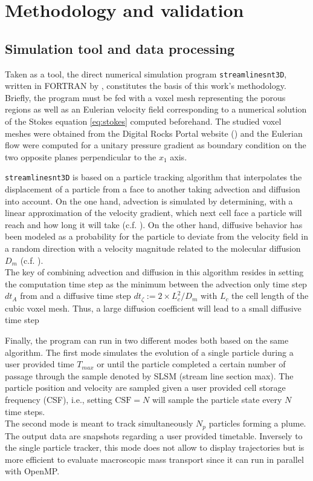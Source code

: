 \chapter{Methodology and validation}
\section{Simulation tool and data processing}
Taken as a tool, the direct numerical simulation program \texttt{streamlinesnt3D}, written in \textsc{FORTRAN} by \citet{Meyer2017}, constitutes the basis of this work's methodology. 
Briefly, the program must be fed with a voxel mesh representing the porous regions as well as an Eulerian velocity field corresponding to a numerical solution of the Stokes equation \eqref{eq:stokes} computed beforehand.
The studied voxel meshes were obtained from the Digital Rocks Portal website (\citet{digitalrocksportal}) and the Eulerian flow were computed for a unitary pressure gradient as boundary condition on the two opposite planes perpendicular to the $x_1$ axis.

\texttt{streamlinesnt3D} is based on a particle tracking algorithm that interpolates the displacement of a particle from a face to another taking advection and diffusion into account.
On the one hand, advection is simulated by determining, with a linear approximation of the velocity gradient, which next cell face a particle will reach and how long it will take (c.f. \cite{Pollock1988}).
On the other hand, diffusive behavior has been modeled as a probability for the particle to deviate from the velocity field in a random direction with a velocity magnitude related to the molecular diffusion $D_m$ (c.f. \citet{Meyer2017}).\\
The key of combining advection and diffusion in this algorithm resides in setting the computation time step as the minimum between the advection only time step $dt_A$ from \citet{Pollock1988} and a diffusive time step $dt_\zeta:=2\times L_c^2/D_m$ with $L_c$ the cell length of the cubic voxel mesh.
Thus, a large diffusion coefficient will lead to a small diffusive time step 

Finally, the program can run in two different modes both based on the same algorithm.
The first mode simulates the evolution of a single particle during a user provided time $T_{max}$ or until the particle completed a certain number of passage through the sample denoted by SLSM (stream line section max). 
The particle position and velocity are sampled given a user provided cell storage frequency (CSF), i.e., setting $\mathrm{CSF}=N$ will sample the particle state every $N$ time steps.\\
The second mode is meant to track simultaneously $N_p$ particles forming a plume. The output data are snapshots regarding a user provided timetable. 
Inversely to the single particle tracker, this mode does not allow to display trajectories but is more efficient to evaluate macroscopic mass transport since it can run in parallel with OpenMP.

